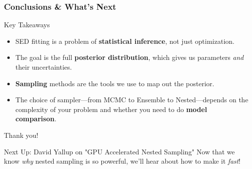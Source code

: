 \documentclass[aspectratio=169]{beamer}
\newcommand{\keyterm}[1]{\textbf{\textcolor{blue!70!black}{#1}}}
\begin{document}
\begin{frame}
    \frametitle{Conclusions \& What's Next}
    
    \begin{block}{Key Takeaways}
        \begin{itemize}
            \item SED fitting is a problem of \keyterm{statistical inference}, not just optimization.
            \item The goal is the full \keyterm{posterior distribution}, which gives us parameters \textit{and} their uncertainties.
            \item \keyterm{Sampling} methods are the tools we use to map out the posterior.
            \item The choice of sampler—from MCMC to Ensemble to Nested—depends on the complexity of your problem and whether you need to do \keyterm{model comparison}.
        \end{itemize}
    \end{block}
    
    \vspace{2em}
    
    \begin{center}
        \huge Thank you!
    \end{center}
    
    \vspace{1em}
    
    \begin{alertblock}{Next Up: David Yallup on "GPU Accelerated Nested Sampling"}
        Now that we know \textit{why} nested sampling is so powerful, we'll hear about how to make it \textit{fast}!
    \end{alertblock}
\end{frame}
\end{document}
